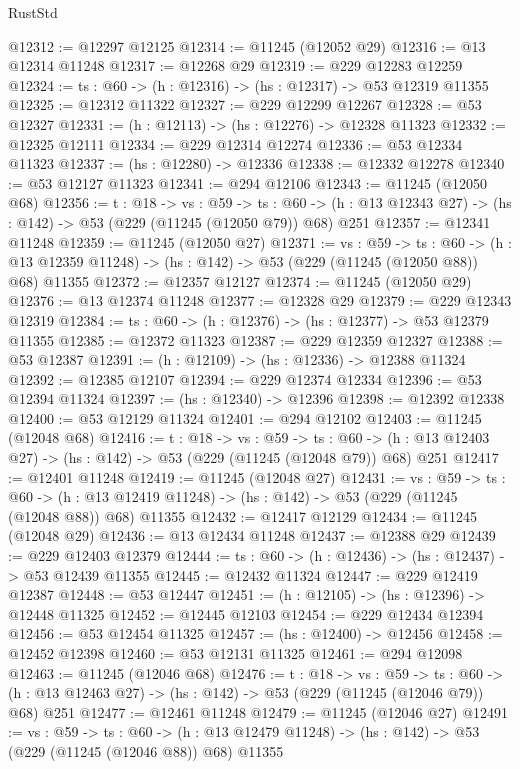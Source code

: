 \begin{lexlean}{RustStd}
\begin{coremodule}
@12312 := @12297 @12125
@12314 := @11245 (@12052 @29)
@12316 := @13 @12314 @11248
@12317 := @12268 @29
@12319 := @229 @12283 @12259
@12324 := {ts : @60} -> (h : @12316) -> (hs : @12317) -> @53 @12319 @11355
@12325 := @12312 @11322
@12327 := @229 @12299 @12267
@12328 := @53 @12327
@12331 := (h : @12113) -> (hs : @12276) -> @12328 @11323
@12332 := @12325 @12111
@12334 := @229 @12314 @12274
@12336 := @53 @12334 @11323
@12337 := (hs : @12280) -> @12336
@12338 := @12332 @12278
@12340 := @53 @12127 @11323
@12341 := @294 @12106
@12343 := @11245 (@12050 @68)
@12356 := {t : @18} ->
  {vs : @59} ->
  {ts : @60} -> (h : @13 @12343 @27) -> (hs : @142) -> @53 (@229 (@11245 (@12050 @79)) @68) @251
@12357 := @12341 @11248
@12359 := @11245 (@12050 @27)
@12371 := {vs : @59} ->
  {ts : @60} ->
  (h : @13 @12359 @11248) -> (hs : @142) -> @53 (@229 (@11245 (@12050 @88)) @68) @11355
@12372 := @12357 @12127
@12374 := @11245 (@12050 @29)
@12376 := @13 @12374 @11248
@12377 := @12328 @29
@12379 := @229 @12343 @12319
@12384 := {ts : @60} -> (h : @12376) -> (hs : @12377) -> @53 @12379 @11355
@12385 := @12372 @11323
@12387 := @229 @12359 @12327
@12388 := @53 @12387
@12391 := (h : @12109) -> (hs : @12336) -> @12388 @11324
@12392 := @12385 @12107
@12394 := @229 @12374 @12334
@12396 := @53 @12394 @11324
@12397 := (hs : @12340) -> @12396
@12398 := @12392 @12338
@12400 := @53 @12129 @11324
@12401 := @294 @12102
@12403 := @11245 (@12048 @68)
@12416 := {t : @18} ->
  {vs : @59} ->
  {ts : @60} -> (h : @13 @12403 @27) -> (hs : @142) -> @53 (@229 (@11245 (@12048 @79)) @68) @251
@12417 := @12401 @11248
@12419 := @11245 (@12048 @27)
@12431 := {vs : @59} ->
  {ts : @60} ->
  (h : @13 @12419 @11248) -> (hs : @142) -> @53 (@229 (@11245 (@12048 @88)) @68) @11355
@12432 := @12417 @12129
@12434 := @11245 (@12048 @29)
@12436 := @13 @12434 @11248
@12437 := @12388 @29
@12439 := @229 @12403 @12379
@12444 := {ts : @60} -> (h : @12436) -> (hs : @12437) -> @53 @12439 @11355
@12445 := @12432 @11324
@12447 := @229 @12419 @12387
@12448 := @53 @12447
@12451 := (h : @12105) -> (hs : @12396) -> @12448 @11325
@12452 := @12445 @12103
@12454 := @229 @12434 @12394
@12456 := @53 @12454 @11325
@12457 := (hs : @12400) -> @12456
@12458 := @12452 @12398
@12460 := @53 @12131 @11325
@12461 := @294 @12098
@12463 := @11245 (@12046 @68)
@12476 := {t : @18} ->
  {vs : @59} ->
  {ts : @60} -> (h : @13 @12463 @27) -> (hs : @142) -> @53 (@229 (@11245 (@12046 @79)) @68) @251
@12477 := @12461 @11248
@12479 := @11245 (@12046 @27)
@12491 := {vs : @59} ->
  {ts : @60} ->
  (h : @13 @12479 @11248) -> (hs : @142) -> @53 (@229 (@11245 (@12046 @88)) @68) @11355

\end{coremodule}
\end{lexlean}
